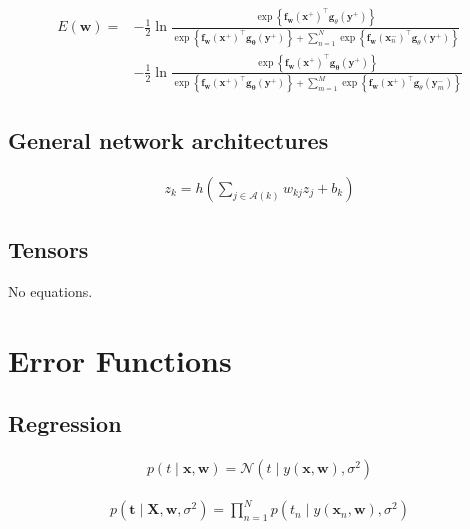 \documentclass{article}
\begin{document}
\begin{align*}
E(\mathbf{w})= & -\frac{1}{2} \ln \frac{\exp \left\{\mathbf{f}_{\mathbf{w}}\left(\mathbf{x}^{+}\right)^{\top} \mathbf{g}_{\theta}\left(\mathbf{y}^{+}\right)\right\}}{\exp \left\{\mathbf{f}_{\mathbf{w}}\left(\mathbf{x}^{+}\right)^{\top} \mathbf{g}_{\boldsymbol{\theta}}\left(\mathbf{y}^{+}\right)\right\}+\sum_{n=1}^{N} \exp \left\{\mathbf{f}_{\mathbf{w}}\left(\mathbf{x}_{n}^{-}\right)^{\top} \mathbf{g}_{\theta}\left(\mathbf{y}^{+}\right)\right\}} \\
& -\frac{1}{2} \ln \frac{\exp \left\{\mathbf{f}_{\mathbf{w}}\left(\mathbf{x}^{+}\right)^{\top} \mathbf{g}_{\boldsymbol{\theta}}\left(\mathbf{y}^{+}\right)\right\}}{\exp \left\{\mathbf{f}_{\mathbf{w}}\left(\mathbf{x}^{+}\right)^{\top} \mathbf{g}_{\boldsymbol{\theta}}\left(\mathbf{y}^{+}\right)\right\}+\sum_{m=1}^{M} \exp \left\{\mathbf{f}_{\mathbf{w}}\left(\mathbf{x}^{+}\right)^{\top} \mathbf{g}_{\theta}\left(\mathbf{y}_{m}^{-}\right)\right\}}
\tag{6.21}
\end{align*}

\subsection{General network architectures}

\begin{align*}
z_{k}=h\left(\sum_{j \in \mathcal{A}(k)} w_{k j} z_{j}+b_{k}\right) 
\tag{6.22}
\end{align*}

\subsection{Tensors}

No equations.

\section{Error Functions}

\subsection{Regression}

\begin{align*}
p(t \mid \mathbf{x}, \mathbf{w})=\mathcal{N}\left(t \mid y(\mathbf{x}, \mathbf{w}), \sigma^{2}\right) 
\tag{6.23}
\end{align*}

\begin{align*}
p\left(\mathbf{t} \mid \mathbf{X}, \mathbf{w}, \sigma^{2}\right)=\prod_{n=1}^{N} p\left(t_{n} \mid y\left(\mathbf{x}_{n}, \mathbf{w}\right), \sigma^{2}\right) 
\tag{6.24}
\end{align*}
\end{document}
